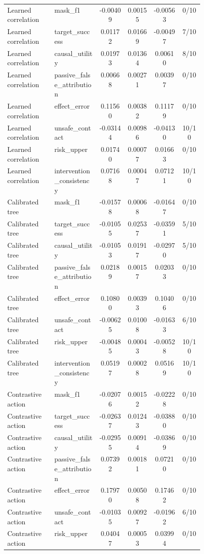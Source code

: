 \documentclass{article}
\begin{document}
\begin{center}
\begin{longtable}{p{0.24\linewidth}p{0.23\linewidth}cccc}
Learned correlation & mask\_f1 & -0.00409 & 0.00155 & -0.00563 & 0/10\\
Learned correlation & target\_success & 0.01172 & 0.01669 & -0.00497 & 7/10\\
Learned correlation & causal\_utility & 0.01973 & 0.01364 & 0.00610 & 8/10\\
Learned correlation & passive\_false\_attribution & 0.00668 & 0.00271 & 0.00397 & 0/10\\
Learned correlation & effect\_error & 0.11560 & 0.00382 & 0.11179 & 0/10\\
Learned correlation & unsafe\_contact & -0.03144 & 0.00986 & -0.04130 & 10/10\\
Learned correlation & risk\_upper & 0.01740 & 0.00077 & 0.01663 & 0/10\\
Learned correlation & intervention\_consistency & 0.07168 & 0.00047 & 0.07121 & 10/10\\
Calibrated tree & mask\_f1 & -0.01578 & 0.00068 & -0.01647 & 0/10\\
Calibrated tree & target\_success & -0.01055 & 0.02537 & -0.03591 & 5/10\\
Calibrated tree & causal\_utility & -0.01053 & 0.01917 & -0.02970 & 5/10\\
Calibrated tree & passive\_false\_attribution & 0.02189 & 0.00157 & 0.02033 & 0/10\\
Calibrated tree & effect\_error & 0.10800 & 0.00393 & 0.10406 & 0/10\\
Calibrated tree & unsafe\_contact & -0.00625 & 0.01008 & -0.01633 & 6/10\\
Calibrated tree & risk\_upper & -0.00485 & 0.00043 & -0.00528 & 10/10\\
Calibrated tree & intervention\_consistency & 0.05197 & 0.00028 & 0.05169 & 10/10\\
Contrastive action & mask\_f1 & -0.02076 & 0.00152 & -0.02228 & 0/10\\
Contrastive action & target\_success & -0.02637 & 0.01243 & -0.03880 & 0/10\\
Contrastive action & causal\_utility & -0.02955 & 0.00914 & -0.03869 & 0/10\\
Contrastive action & passive\_false\_attribution & 0.07392 & 0.00181 & 0.07210 & 0/10\\
Contrastive action & effect\_error & 0.17970 & 0.00508 & 0.17462 & 0/10\\
Contrastive action & unsafe\_contact & -0.01035 & 0.00927 & -0.01962 & 6/10\\
Contrastive action & risk\_upper & 0.04047 & 0.00053 & 0.03994 & 0/10\\

\end{longtable}
\end{center}
\end{document}
